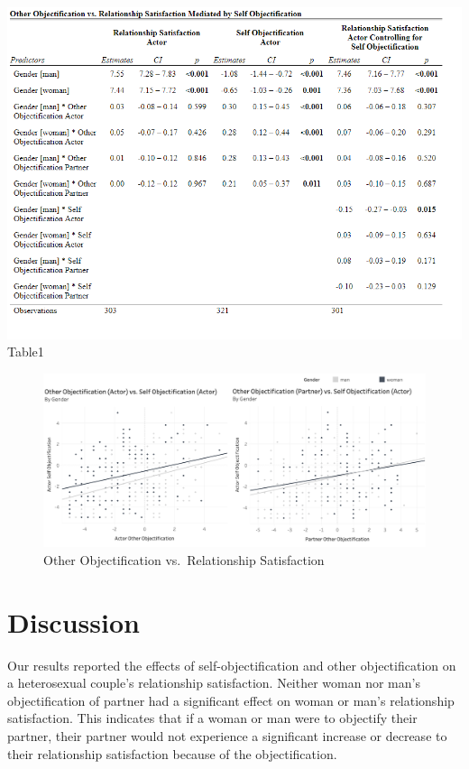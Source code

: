 \documentclass[
  man]{apa6}
\begin{document}
\includegraphics{Images/ResultsTableEdited.png} Table1

\begin{figure}
\centering
\includegraphics{Images/OO_vs_RSA.png}
\caption{Other Objectification vs.~Relationship Satisfaction}
\end{figure}

\hypertarget{discussion}{%
\section{Discussion}\label{discussion}}

Our results reported the effects of self-objectification and other objectification on a heterosexual couple's relationship satisfaction. Neither woman nor man's objectification of partner had a significant effect on woman or man's relationship satisfaction. This indicates that if a woman or man were to objectify their partner, their partner would not experience a significant increase or decrease to their relationship satisfaction because of the objectification.
\end{document}
